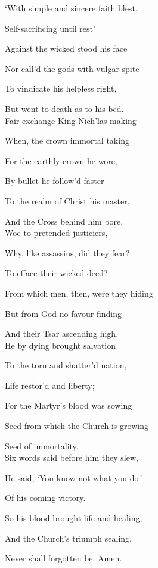\begin{multicols}{2}
`With simple and sincere faith blest,

Self-sacrificing until rest'

Against the wicked stood his face

Nor call'd the gods with vulgar spite

To vindicate his helpless right,

But went to death as to his bed.\\

Fair exchange King Nich'las making

When, the crown immortal taking

For the earthly crown he wore,

By bullet he follow'd faster

To the realm of Christ his master,

And the Cross behind him bore.\\

Woe to pretended justiciers,

Why, like assassins, did they fear?

To efface their wicked deed?

From which men, then, were they hiding

But from God no favour finding

And their Tsar ascending high.\\


He by dying brought salvation

To the torn and shatter'd nation,

Life restor'd and liberty;

For the Martyr's blood was sowing

Seed from which the Church is growing

Seed of immortality.\\

Six words said before him they slew,


He said, `You know not what you do.'

Of his coming victory.

So his blood brought life and healing,

And the Church's triumph sealing,

Never shall forgotten be. Amen.
\end{multicols}
